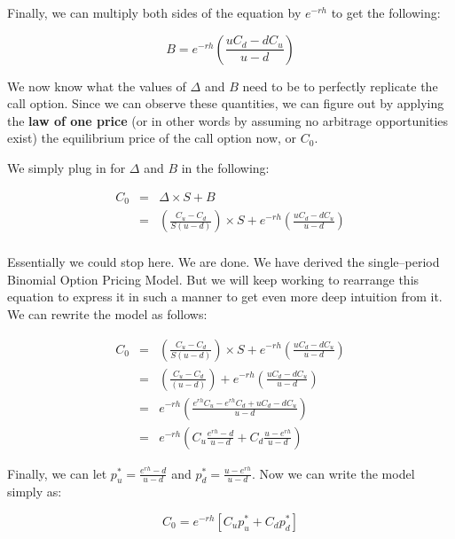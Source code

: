 \documentclass[11pt]{article}
\begin{document}
\medskip
Finally, we can multiply both sides of the equation by $e^{-rh}$ to get the following:

\medskip
\begin{equation*}
B = e^{-rh} \left( \frac{u C_{d} - d C_{u}}{u-d} \right)
\end{equation*}

\medskip
We now know what the values of $\Delta$ and $B$ need to be to perfectly replicate the call option. Since
we can observe these quantities, we can figure out by applying the \textbf{law of one price} (or in
other words by assuming no arbitrage opportunities exist) the equilibrium price of the call option
now, or $C_{0}$.

\medskip
We simply plug in for $\Delta$ and $B$ in the following:

\begin{eqnarray*}
C_{0} &=& \Delta \times S + B \\
      &=& \left( \frac{C_{u} - C_{d}}{S(u-d)} \right) \times S + e^{-rh} \left( \frac{u C_{d} - d C_{u}}{u-d} \right) \\
\end{eqnarray*}

\medskip
Essentially we could stop here.  We are done.  We have derived the single--period Binomial Option Pricing Model. But
we will keep working to rearrange this equation to express it in such a manner to get even more deep intuition from it.
We can rewrite the model as follows:

\medskip
\begin{eqnarray*}
C_{0} &=& \left( \frac{C_{u} - C_{d}}{S(u-d)} \right) \times S + e^{-rh} \left( \frac{u C_{d} - d C_{u}}{u-d} \right) \\
      &=& \left( \frac{C_{u} - C_{d}}{(u-d)} \right) + e^{-rh} \left( \frac{u C_{d} - d C_{u}}{u-d} \right) \\
      &=& e^{-rh} \left( \frac{e^{rh} C_{u} - e^{rh} C_{d} + u C_{d} - d C_{u}}{u-d} \right) \\
      &=& e^{-rh} \left(C_{u} \frac{e^{rh} - d}{u-d} + C_{d} \frac{u - e^{rh}}{u-d} \right)
\end{eqnarray*}

\medskip
Finally, we can let $p_{u}^{\ast} = \frac{e^{rh} - d}{u-d}$ and $p_{d}^{\ast} = \frac{u - e^{rh}}{u-d}$. Now we can write the
model simply as:

\medskip
\begin{equation*}
C_{0} = e^{-rh} \left[ C_{u} p_{u}^{\ast} + C_{d} p_{d}^{\ast} \right]
\end{equation*}
\end{document}
